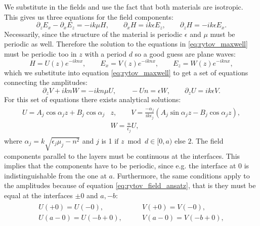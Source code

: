 We substitute in the fields and use the fact that both materials are isotropic. This gives us three equations for the field components:
\begin{equation}
    \label{eq:rytov_maxwell}
    \partial_z E_x - \partial_x E_z = - ik \mu H,
    \qquad
    \partial_x H = ik \epsilon E_z,
    \qquad
    \partial_z H = -ik \epsilon E_x.
\end{equation}
Necessarily, since the structure of the material is periodic $\epsilon$ and $\mu$ must be periodic as well. Therefore the solution to the equations in \ref{eq:rytov_maxwell} must be periodic too in $z$ with a period $d$ so a good guess are plane waves:
\begin{equation}
    \label{eq:rytov_field_ansatz}
    H = U(z)e^{-iknx},
    \qquad
    E_x = V(z)e^{-iknx},
    \qquad
    E_z = W(z)e^{-iknx},
\end{equation}
which we substitute into equation \ref{eq:rytov_maxwell} to get a set of equations connecting the amplitudes:
\begin{equation}
    \partial_z V + iknW = -ikn \mu U,
    \qquad
    -Un = \epsilon W,
    \qquad
    \partial_z U = ik \epsilon V.
\end{equation}
For this set of equations there exists analytical solutions:
\begin{align}
\begin{split}
    \label{eq:rytov_amplitudes}
    U=A_j\cos \alpha_jz + B_j\cos \alpha_j & z, 
    \qquad
    V=\frac{-\alpha_j}{ik\epsilon_j}(A_j\sin \alpha_j z -B_j\cos \alpha_j z ),
    \\
    &W=\frac{n}{\epsilon_j}U,
\end{split}
\end{align}
where $\alpha_j = k \sqrt{\epsilon_j\mu_j-n^2}$ and $j$ is 1 $\text{if $z \bmod d \in [0, a)$}$ else $2$. The field components parallel to the layers must be continuous at the interfaces. This implies that the components have to be periodic, since e.g. the interface at $0$ is indistinguishable from the one at $a$. Furthermore, the same conditions apply to the amplitudes because of equation \ref{eq:rytov_field_ansatz}, that is they must be equal at the interfaces $\pm 0$ and $a, -b$:
\begin{align}
\begin{split}
    U(+0) = U(-0), 
    \qquad
    &V(+0) = V(-0),
    \\
    U(a-0) = U(-b+0),
    \qquad
    &V(a-0) = V(-b+0),
\end{split}
\end{align}

